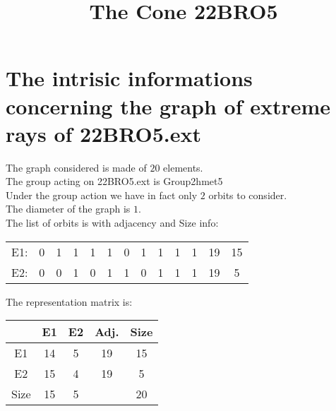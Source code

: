 \documentclass[12pt]{article}
\title{The Cone 22BRO5}
\begin{document}
\maketitle
\section{The intrisic informations concerning the graph of extreme rays of 22BRO5.ext}
The graph considered is made of $20$ elements.\\
The group acting on 22BRO5.ext is Group2hmet5\\
Under the group action we have in fact only $2$ orbits to consider.\\
The diameter of the graph is $1$.\\
The list of orbits is with adjacency and Size info:
\begin{center}
\scriptsize
\begin{tabular}{ccccccccccc|c|c}
E1:&0&1&1&1&1&0&1&1&1&1&19&15\\
E2:&0&0&1&0&1&1&0&1&1&1&19&5\\
\end{tabular}
\end{center}
The representation matrix is:
\begin{center}
\scriptsize
\begin{tabular}{|c|cc|c|c|}
\hline
&E1&E2&Adj.&Size\\
\hline
E1& 14& 5&19&15\\
E2& 15& 4&19&5\\
\hline
Size&15&5&&20\\
\hline
\end{tabular}
\end{center}
\end{document}
